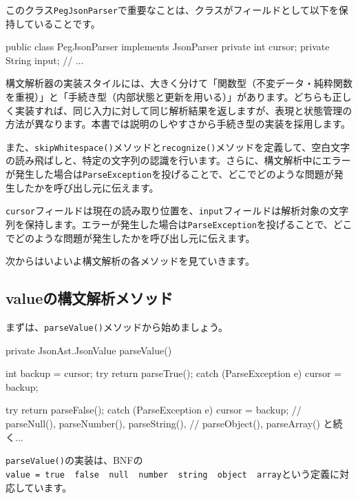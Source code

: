 このクラス\texttt{PegJsonParser}で重要なことは、クラスがフィールドとして以下を保持していることです。

\begin{codescreen}{}
public class PegJsonParser implements JsonParser {
    private int cursor;
    private String input;
    // ...
}
\end{codescreen}

構文解析器の実装スタイルには、大きく分けて「関数型（不変データ・純粋関数を重視）」と「手続き型（内部状態と更新を用いる）」があります。どちらも正しく実装すれば、同じ入力に対して同じ解析結果を返しますが、表現と状態管理の方法が異なります。本書では説明のしやすさから手続き型の実装を採用します。

また、\texttt{skipWhitespace()}メソッドと\texttt{recognize()}メソッドを定義して、空白文字の読み飛ばしと、特定の文字列の認識を行います。さらに、構文解析中にエラーが発生した場合は\texttt{ParseException}を投げることで、どこでどのような問題が発生したかを呼び出し元に伝えます。

\texttt{cursor}フィールドは現在の読み取り位置を、\texttt{input}フィールドは解析対象の文字列を保持します。エラーが発生した場合は\texttt{ParseException}を投げることで、どこでどのような問題が発生したかを呼び出し元に伝えます。

次からはいよいよ構文解析の各メソッドを見ていきます。

\subsection{valueの構文解析メソッド}

まずは、\texttt{parseValue()}メソッドから始めましょう。

\begin{codescreen}{}
    private JsonAst.JsonValue parseValue() {
        int backup = cursor;
        try {
            return parseTrue();
        } catch (ParseException e) {
            cursor = backup;
        }

        try {
            return parseFalse();
        } catch (ParseException e) {
            cursor = backup;
        }
        // parseNull(), parseNumber(), parseString(), 
        // parseObject(), parseArray() と続く...
    }
\end{codescreen}

\texttt{parseValue()}の実装は、BNFの\texttt{value\ =\ true\ \textbar{}\ false\ \textbar{}\ null\ \textbar{}\ number\ \textbar{}\ string\ \textbar{}\ object\ \textbar{}\ array}という定義に対応しています。

